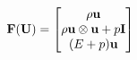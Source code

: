 \documentclass[preview]{standalone}
\begin{document}
\begin{align*}
\special{dvisvgm:raw <g id='unique000'>}\mathbf{F}(\mathbf{U}) = \begin{bmatrix}\rho\mathbf{u} \\ \rho\mathbf{u}\otimes\mathbf{u} + p\mathbf{I} \\(E+p)\mathbf{u}\end{bmatrix}\special{dvisvgm:raw </g>}
\end{align*}
\end{document}
